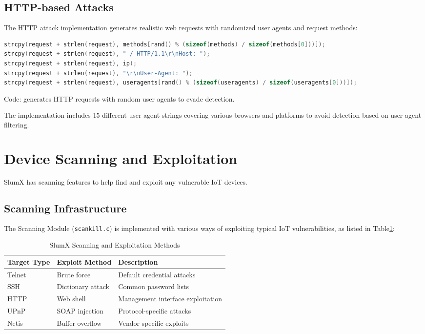 \documentclass[12pt,letterpaper]{report}
\begin{document}
\subsection{HTTP-based Attacks}

The HTTP attack implementation generates realistic web requests with randomized user agents and request methods:

\begin{lstlisting}[language=C, caption=HTTP Attack Implementation]
strcpy(request + strlen(request), methods[rand() % (sizeof(methods) / sizeof(methods[0]))]);
strcpy(request + strlen(request), " / HTTP/1.1\r\nHost: ");
strcpy(request + strlen(request), ip);
strcpy(request + strlen(request), "\r\nUser-Agent: ");
strcpy(request + strlen(request), useragents[rand() % (sizeof(useragents) / sizeof(useragents[0]))]);
\end{lstlisting}
\begin{center}\small Code: generates HTTP requests with random user agents to evade detection.\end{center}

The implementation includes 15 different user agent strings covering various browsers and platforms to avoid detection based on user agent filtering.

\section{Device Scanning and Exploitation}

SlumX has scanning features to help find and exploit any vulnerable IoT devices.

\subsection{Scanning Infrastructure}

The Scanning Module (\texttt{scankill.c}) is implemented with various ways of exploiting typical IoT vulnerabilities, as listed in Table\ref{tab:scanning}:

\begin{table}[H]
\centering
\caption{SlumX Scanning and Exploitation Methods}
\label{tab:scanning}
\begin{tabular}{|l|l|p{5cm}|}
\hline
\textbf{Target Type} & \textbf{Exploit Method} & \textbf{Description} \\
\hline
Telnet & Brute force & Default credential attacks \\
SSH & Dictionary attack & Common password lists \\
HTTP & Web shell & Management interface exploitation \\
UPnP & SOAP injection & Protocol-specific attacks \\
Netis & Buffer overflow & Vendor-specific exploits \\
\hline
\end{tabular}
\end{table}
\end{document}
